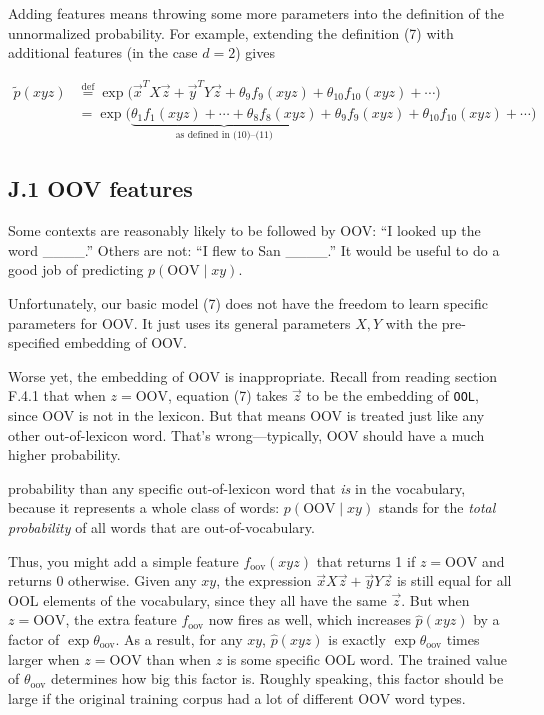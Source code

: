 \documentclass[12pt]{article}
\theoremstyle{plain}
\theoremstyle{definition}
\theoremstyle{remark}
\begin{document}
Adding features means throwing some more parameters into the definition of the unnormalized probability. For example, extending the definition (7) with additional features (in the case $d=2$) gives

\begin{align}
\tilde{p}(xyz) &\stackrel{\mathrm{def}}{=} \exp\Big(\vec{x}^T X \vec{z} + \vec{y}^T Y \vec{z} + \theta_9 f_9(xyz) + \theta_{10} f_{10}(xyz) + \cdots \Big) \\
&= \exp\Bigg(\underbrace{\theta_1 f_1(xyz) + \cdots + \theta_8 f_8(xyz)}_{\text{as defined in (10)--(11)}} + \theta_9 f_9(xyz) + \theta_{10} f_{10}(xyz) + \cdots \Bigg)
\end{align}

\subsection*{J.1 OOV features}

Some contexts are reasonably likely to be followed by OOV: “I looked up the word \_\_\_\_.” Others are not: “I flew to San \_\_\_\_.” It would be useful to do a good job of predicting $p(\text{OOV} \mid xy)$.

Unfortunately, our basic model (7) does not have the freedom to learn specific parameters for OOV. It just uses its general parameters $X, Y$ with the pre-specified embedding of OOV.

Worse yet, the embedding of OOV is inappropriate. Recall from reading section F.4.1 that when $z=\text{OOV}$, equation (7) takes $\vec{z}$ to be the embedding of \texttt{OOL}, since OOV is not in the lexicon. But that means OOV is treated just like any other out-of-lexicon word. That’s wrong—typically, OOV should have a much higher probability.

probability than any specific out-of-lexicon word that \emph{is} in the vocabulary, because it represents a whole 
class of words: $p(\text{OOV} \mid xy)$ stands for the \emph{total probability} of all words that are out-of-vocabulary. 

Thus, you might add a simple feature $f_{\text{oov}}(xyz)$ that returns 1 if $z = \text{OOV}$ and returns 0 otherwise. 
Given any $xy$, the expression $\vec{x}X\vec{z} + \vec{y}Y\vec{z}$ is still equal for all OOL elements of the vocabulary, since they 
all have the same $\vec{z}$. But when $z = \text{OOV}$, the extra feature $f_{\text{oov}}$ now fires as well, which increases $\hat{p}(xyz)$ 
by a factor of $\exp \theta_{\text{oov}}$. As a result, for any $xy$, $\hat{p}(xyz)$ is exactly $\exp \theta_{\text{oov}}$ times larger when $z = \text{OOV}$ than 
when $z$ is some specific OOL word. The trained value of $\theta_{\text{oov}}$ determines how big this factor is. Roughly 
speaking, this factor should be large if the original training corpus had a lot of different OOV word types. 
\end{document}
